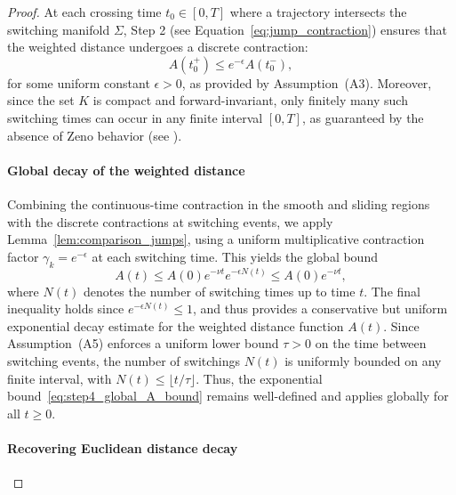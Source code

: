 \documentclass[11pt]{article}
\begin{document}
\begin{proof}
At each crossing time \( t_0 \in [0,T] \) where a trajectory intersects the switching manifold \( \Sigma \), Step 2 (see Equation~\eqref{eq:jump_contraction}) ensures that the weighted distance undergoes a discrete contraction:
\begin{equation} \label{eq:step4_jump_contraction}
	A(t_0^+) \leq e^{-\epsilon} A(t_0^-),
\end{equation}
for some uniform constant \( \epsilon > 0 \), as provided by Assumption~(A3). Moreover, since the set \( K \) is compact and forward-invariant, only finitely many such switching times can occur in any finite interval \( [0,T] \), as guaranteed by the absence of Zeno behavior (see \cite[Theorem 10.2]{filippov1988}).


\paragraph{Global decay of the weighted distance}

Combining the continuous-time contraction in the smooth and sliding regions with the discrete contractions at switching events, we apply Lemma~\ref{lem:comparison_jumps}, using a uniform multiplicative contraction factor \( \gamma_k = e^{-\epsilon} \) at each switching time. This yields the global bound
\begin{equation} \label{eq:step4_global_A_bound}
	A(t) \leq A(0) e^{-\nu t} e^{-\epsilon N(t)} \leq A(0) e^{-\nu t},
\end{equation}
where \( N(t) \) denotes the number of switching times up to time \( t \). The final inequality holds since \( e^{-\epsilon N(t)} \leq 1 \), and thus provides a conservative but uniform exponential decay estimate for the weighted distance function \( A(t) \). Since Assumption~(A5) enforces a uniform lower bound \( \tau > 0 \) on the time between switching events, the number of switchings \( N(t) \) is uniformly bounded on any finite interval, with \( N(t) \leq \lfloor t / \tau \rfloor \). Thus, the exponential bound~\eqref{eq:step4_global_A_bound} remains well-defined and applies globally for all \( t \geq 0 \).



\paragraph{Recovering Euclidean distance decay}


\end{proof}
\end{document}
